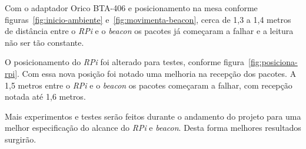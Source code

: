 \documentclass[
	12pt,				%
	openright,			%
	oneside,			%
	a4paper,			%
	chapter=TITLE,		%
	english,			%
	brazil				%
	]{abntex2}
\begin{document}
{Com o adaptador Orico BTA-406 e posicionamento na mesa conforme figuras~\ref{fig:inicio-ambiente} e~\ref{fig:movimenta-beacon}, cerca de 1,3 a 1,4 metros de distância entre o \textit{RPi} e o \textit{beacon} os pacotes já começaram a falhar e a leitura não ser tão constante.

O posicionamento do \textit{RPi} foi alterado para testes, conforme figura~\ref{fig:posiciona-rpi}. Com essa nova posição foi notado uma melhoria na recepção dos pacotes. A 1,5 metros entre o \textit{RPi} e o \textit{beacon} os pacotes começaram a falhar, com recepção notada até 1,6 metros.

\begin{figure}[htb]
\end{figure}

Mais experimentos e testes serão feitos durante o andamento do projeto para uma melhor especificação do alcance do \textit{RPi} e \textit{beacon}. Desta forma melhores resultados surgirão.



}
\end{document}
